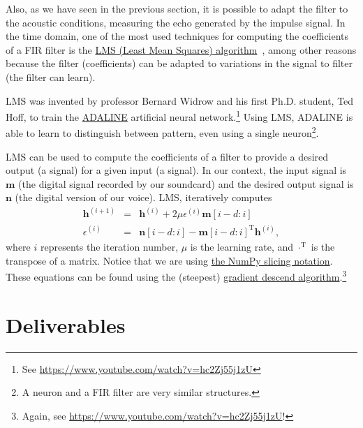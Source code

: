Also, as we have seen in the previous section, it is possible to adapt
the filter to the acoustic conditions, measuring the echo generated by
the impulse signal. In the time domain, one of the most used
techniques for computing the coefficients of a FIR filter is the
\href{https://en.wikipedia.org/wiki/Least_mean_squares_filter}{LMS
  (Least Mean Squares)
  algorithm}~\cite{haykin1995adaptive,boyd2004convex}, among other
reasons because the filter (coefficients) can be adapted to variations
in the signal to filter (the filter can learn).

LMS was invented by professor Bernard Widrow and his first
Ph.D. student, Ted Hoff, to train the
\href{https://en.wikipedia.org/wiki/ADALINE}{ADALINE} artificial
neural network.\footnote{See
  \url{https://www.youtube.com/watch?v=hc2Zj55j1zU}} Using LMS,
ADALINE is able to learn to distinguish between pattern, even using a
single neuron\footnote{A neuron and a FIR filter are very similar
  structures.}.

LMS can be used to compute the coefficients of a filter to provide a
desired output (a signal) for a given input (a signal). In our
context, the input signal is ${\mathbf m}$ (the digital signal
recorded by our soundcard) and the desired output signal is
${\mathbf n}$ (the digital version of our voice). LMS, iteratively
computes
\begin{eqnarray}
  {\mathbf h}^{(i+1)} & = & {\mathbf h}^{(i)} + 2\mu\epsilon^{(i)}{\mathbf m}[i-d:i] \\
  \epsilon^{(i) }& = & {\mathbf n}[i-d:i] - {\mathbf m}[i-d:i]^\mathrm{T}{\mathbf h}^{(i)},
\end{eqnarray}
where $i$ represents the iteration number, $\mu$ is the learning rate,
and $\cdot^\mathrm{T}$ is the transpose of a matrix. Notice that we
are using
\href{https://numpy.org/doc/stable/user/basics.indexing.html}{the
  NumPy slicing notation}. These equations can be found using the
(steepest)
\href{https://en.wikipedia.org/wiki/Gradient_descent}{gradient descend
  algorithm}.\footnote{Again, see
  \url{https://www.youtube.com/watch?v=hc2Zj55j1zU}!}

\section{Deliverables}

